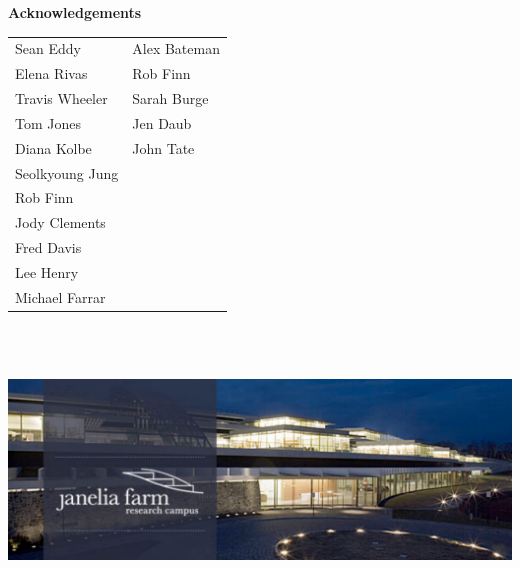 \documentclass[landscape]{slides}
\begin{document}
\begin{slide}

\large
\begin{center}
\large{\textbf{Acknowledgements}} \\

\vspace{0.5in}

\normalsize
\begin{tabular}{ll}
Sean Eddy           & Alex Bateman \\
Elena Rivas         & Rob Finn \\
Travis Wheeler      & Sarah Burge \\
Tom Jones           & Jen Daub \\
Diana Kolbe         & John Tate \\
Seolkyoung Jung     & \\
Rob Finn            & \\
Jody Clements       & \\
Fred Davis          & \\
Lee Henry           & \\
Michael Farrar      & \\
\end{tabular}

\includegraphics[height=3in]{figs/jfrc-banner1}

\end{center}

\vfill
\end{slide}
\end{document}

